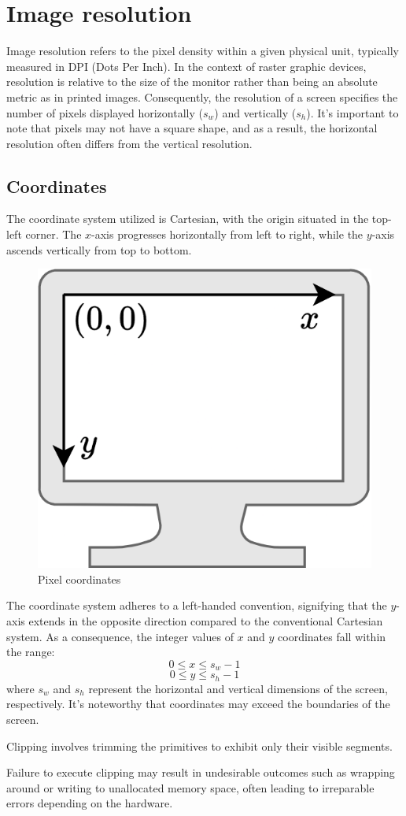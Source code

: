 \section{Image resolution}

Image resolution refers to the pixel density within a given physical unit, typically measured in DPI (Dots Per Inch). 
In the context of raster graphic devices, resolution is relative to the size of the monitor rather than being an absolute metric as in printed images. 
Consequently, the resolution of a screen specifies the number of pixels displayed horizontally ($s_w$) and vertically ($s_h$). 
It's important to note that pixels may not have a square shape, and as a result, the horizontal resolution often differs from the vertical resolution.

\subsection{Coordinates}
The coordinate system utilized is Cartesian, with the origin situated in the top-left corner. The $x$-axis progresses horizontally from left to right, while the $y$-axis ascends vertically from top to bottom.
\begin{figure}[H]
    \centering
    \includegraphics[width=0.25\linewidth]{images/coordinates.png}
    \caption{Pixel coordinates}
\end{figure}
The coordinate system adheres to a left-handed convention, signifying that the $y$-axis extends in the opposite direction compared to the conventional Cartesian system.
As a consequence, the integer values of $x$ and $y$ coordinates fall within the range:
\[0 \leq x \leq s_w-1\]
\[0 \leq y \leq s_h-1\]
where $s_w$ and $s_h$ represent the horizontal and vertical dimensions of the screen, respectively.
It's noteworthy that coordinates may exceed the boundaries of the screen.

\begin{definition}
    Clipping involves trimming the primitives to exhibit only their visible segments.
\end{definition}
Failure to execute clipping may result in undesirable outcomes such as wrapping around or writing to unallocated memory space, often leading to irreparable errors depending on the hardware.


